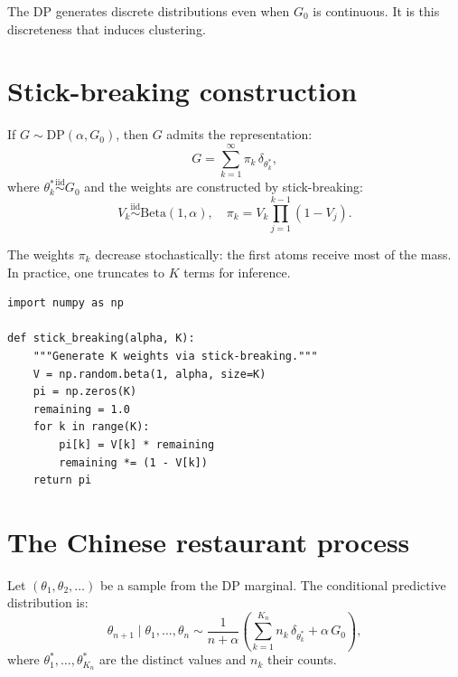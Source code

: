 \begin{attention}
The DP generates discrete distributions even when $G_0$ is continuous.
It is this discreteness that induces clustering.
\end{attention}

\section{Stick-breaking construction}

\begin{theorem}[Sethuraman, 1994]
If $G \sim \mathrm{DP}(\alpha, G_0)$, then $G$ admits the representation:
\[
  G = \sum_{k=1}^{\infty} \pi_k \,\delta_{\theta_k^*},
\]
where $\theta_k^* \stackrel{\text{iid}}{\sim} G_0$ and the weights are
constructed by stick-breaking:
\[
  V_k \stackrel{\text{iid}}{\sim} \mathrm{Beta}(1, \alpha), \quad
  \pi_k = V_k \prod_{j=1}^{k-1}(1 - V_j).
\]
\end{theorem}

\begin{remark}
The weights $\pi_k$ decrease stochastically: the first atoms receive most
of the mass. In practice, one truncates to $K$ terms for inference.
\end{remark}

\begin{verbatim}
import numpy as np

def stick_breaking(alpha, K):
    """Generate K weights via stick-breaking."""
    V = np.random.beta(1, alpha, size=K)
    pi = np.zeros(K)
    remaining = 1.0
    for k in range(K):
        pi[k] = V[k] * remaining
        remaining *= (1 - V[k])
    return pi
\end{verbatim}

\section{The Chinese restaurant process}

\begin{definition}
Let $(\theta_1, \theta_2, \ldots)$ be a sample from the DP marginal.
The conditional predictive distribution is:
\[
  \theta_{n+1} \mid \theta_1, \ldots, \theta_n \sim
  \frac{1}{n + \alpha}\left(\sum_{k=1}^{K_n} n_k\,\delta_{\theta_k^*}
  + \alpha\,G_0\right),
\]
where $\theta_1^*, \ldots, \theta_{K_n}^*$ are the distinct values and $n_k$
their counts.
\end{definition}

